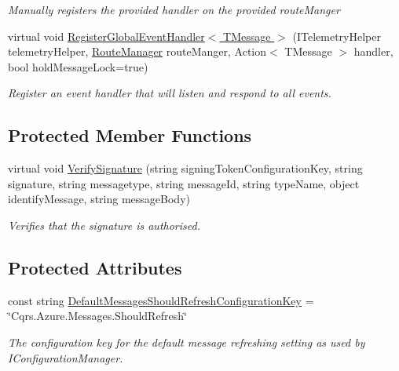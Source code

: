 \begin{DoxyCompactItemize}
\begin{DoxyCompactList}\small\item\em Manually registers the provided {\itshape handler}  on the provided {\itshape route\+Manger}  \end{DoxyCompactList}\item 
virtual void \hyperlink{classCqrs_1_1Azure_1_1ServiceBus_1_1AzureBusHelper_ac1955fe076ac3ef09a2cad1121c36ba2_ac1955fe076ac3ef09a2cad1121c36ba2}{Register\+Global\+Event\+Handler$<$ T\+Message $>$} (I\+Telemetry\+Helper telemetry\+Helper, \hyperlink{classCqrs_1_1Bus_1_1RouteManager}{Route\+Manager} route\+Manger, Action$<$ T\+Message $>$ handler, bool hold\+Message\+Lock=true)
\begin{DoxyCompactList}\small\item\em Register an event handler that will listen and respond to all events. \end{DoxyCompactList}\end{DoxyCompactItemize}
\subsection*{Protected Member Functions}
\begin{DoxyCompactItemize}
\item 
virtual void \hyperlink{classCqrs_1_1Azure_1_1ServiceBus_1_1AzureBusHelper_a6f35e150ca60f71a73c2f9a6e03f9f56_a6f35e150ca60f71a73c2f9a6e03f9f56}{Verify\+Signature} (string signing\+Token\+Configuration\+Key, string signature, string messagetype, string message\+Id, string type\+Name, object identify\+Message, string message\+Body)
\begin{DoxyCompactList}\small\item\em Verifies that the signature is authorised. \end{DoxyCompactList}\end{DoxyCompactItemize}
\subsection*{Protected Attributes}
\begin{DoxyCompactItemize}
\item 
const string \hyperlink{classCqrs_1_1Azure_1_1ServiceBus_1_1AzureBusHelper_a5d1dcc91b08727fbaee0ec6d32106b16_a5d1dcc91b08727fbaee0ec6d32106b16}{Default\+Messages\+Should\+Refresh\+Configuration\+Key} = \char`\"{}Cqrs.\+Azure.\+Messages.\+Should\+Refresh\char`\"{}
\begin{DoxyCompactList}\small\item\em The configuration key for the default message refreshing setting as used by I\+Configuration\+Manager. \end{DoxyCompactList}\end{DoxyCompactItemize}
